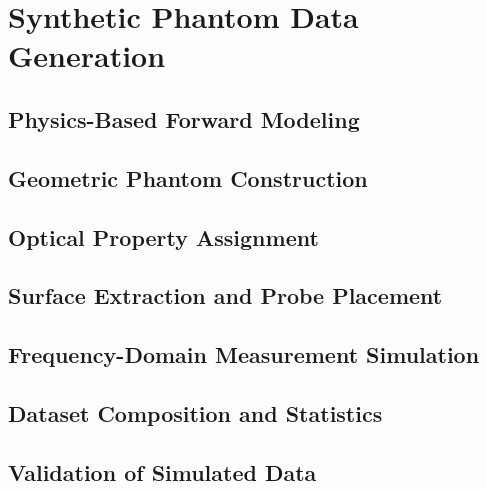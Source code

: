 
\chapter{Synthetic Phantom Data Generation}

\section{Physics-Based Forward Modeling}

\section{Geometric Phantom Construction}

\section{Optical Property Assignment}

\section{Surface Extraction and Probe Placement}

\section{Frequency-Domain Measurement Simulation}

\section{Dataset Composition and Statistics}

\section{Validation of Simulated Data}

